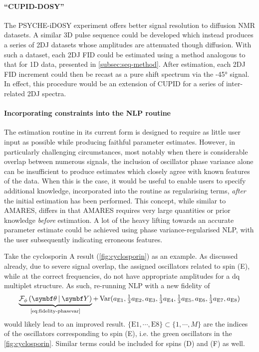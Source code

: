 \paragraph{``\ac{CUPID}-\ac{DOSY}''}
The \ac{PSYCHE}-i\ac{DOSY} experiment offers better signal resolution to
diffusion \ac{NMR} datasets.
A similar \ac{3D} pulse sequence could be developed
which instead produces a series of \ac{2DJ} datasets whose amplitudes are
attenuated though diffusion. With such a dataset, each \ac{2DJ} \ac{FID} could
be estimated using a method analogous to that for \ac{1D} data, presented in
\cref{subsec:seq-method}. After estimation, each \ac{2DJ} \ac{FID} increment
could then be recast as a pure shift spectrum via the \ang{-45} signal. In
effect, this procedure would be an extension of \ac{CUPID} for a series of
inter-related \ac{2DJ} spectra.

\paragraph{Incorporating constraints into the \ac{NLP} routine}
The estimation routine in its current form is designed to require as little
user input as possible while producing faithful parameter estimates. However,
in particularly challenging circumstances, most notably when
there is considerable overlap between numerous signals, the inclusion of
oscillator phase variance alone can be insufficient to produce estimates which
closely agree with known features of the data. When this is the case, it would
be useful to enable users to specify additional knowledge, incorporated into
the routine as regularising terms, \emph{after} the initial estimation has been
performed. This concept, while similar to \ac{AMARES}, differs
in that \ac{AMARES} requires very large quantities or prior knowledge
\emph{before} estimation. A lot of the heavy lifting towards an accurate
parameter estimate could be achieved using phase variance-regularised \ac{NLP},
with the user subsequently indicating erroneous features.

Take the cyclosporin A result (\cref{fig:cyclosporin}) as an example. As
discussed already, due to severe signal overlap, the assigned oscillators
related to spin (E), while at the correct frequencies, do not have appropriate
amplitudes for a dq multiplet structure. As such, re-running \ac{NLP} with a
new fidelity of
\[
    \underbrace{\FphithY}_{
        \text{\cref{eq:fidelity-phasevar}}
    }+ \Var(
        a_{\text{E}1},
        \tfrac{1}{3} a_{\text{E}2},
        a_{\text{E}3},
        \tfrac{1}{3} a_{\text{E}4},
        \tfrac{1}{3} a_{\text{E}5},
        a_{\text{E}6},
        \tfrac{1}{3} a_{\text{E}7},
        a_{\text{E}8}
    )
\]
would likely lead to an improved result.
$\lbrace \text{E}1, \cdots, \text{E}8 \rbrace \subset \lbrace 1, \cdots, M \rbrace$ are the
indices of the oscillators corresponding to spin (E), i.e. the green
oscillators in the \cref{fig:cyclosporin}. Similar terms could be included
for spins (D) and (F) as well.
